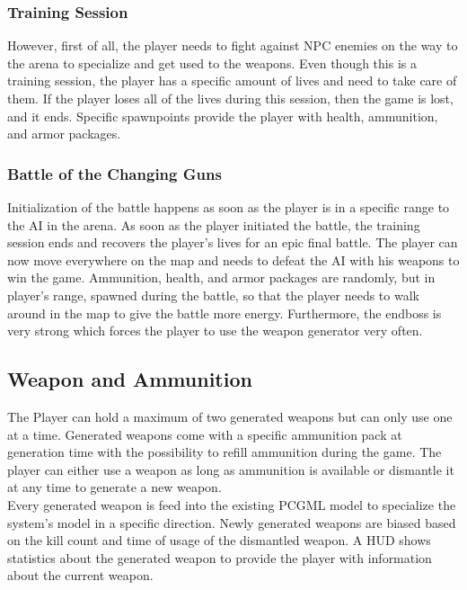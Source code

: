 \documentclass[MGS,Master,english]{twbook}%
\begin{document}
\subsubsection{Training Session}
However, first of all, the player needs to fight against NPC enemies on the way to the arena to specialize and get used to the weapons. Even though this is a training session, the player has a specific amount of lives and need to take care of them. If the player loses all of the lives during this session, then the game is lost, and it ends. Specific spawnpoints provide the player with health, ammunition, and armor packages.

\subsubsection{Battle of the Changing Guns}
Initialization of the battle happens as soon as the player is in a specific range to the AI in the arena. As soon as the player initiated the battle, the training session ends and recovers the player's lives for an epic final battle. The player can now move everywhere on the map and needs to defeat the AI with his weapons to win the game. Ammunition, health, and armor packages are randomly, but in player's range, spawned during the battle, so that the player needs to walk around in the map to give the battle more energy. Furthermore, the endboss is very strong which forces the player to use the weapon generator very often. 

\subsection{Weapon and Ammunition}
The Player can hold a maximum of two generated weapons but can only use one at a time. Generated weapons come with a specific ammunition pack at generation time with the possibility to refill ammunition during the game. The player can either use a weapon as long as ammunition is available or dismantle it at any time to generate a new weapon.\\
Every generated weapon is feed into the existing PCGML model to specialize the system’s model in a specific direction. Newly generated weapons are biased based on the kill count and time of usage of the dismantled weapon. A \ac{HUD} shows statistics about the generated weapon to provide the player with information about the current weapon. 
\end{document}
